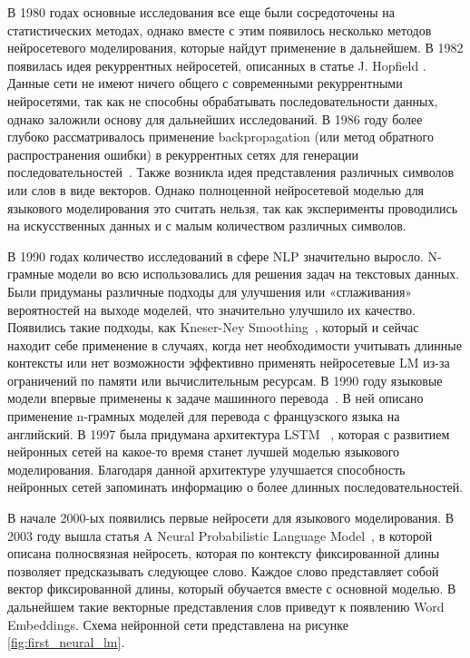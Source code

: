 В 1980 годах основные исследования все еще были сосредоточены на статистических методах, однако вместе с этим появилось несколько методов нейросетевого моделирования, которые найдут применение в дальнейшем. В 1982 появилась идея рекуррентных нейросетей, описанных в статье J. Hopfield \cite{hopfield_rnn}. Данные сети не имеют ничего общего с современными рекуррентными нейросетями, так как не способны обрабатывать последовательности данных, однако заложили основу для дальнейших исследований. В 1986 году более глубоко рассматривалось применение backpropagation (или метод обратного распространения ошибки) в рекуррентных сетях для генерации последовательностей~\cite{rumelhart_backprop}. Также возникла идея представления различных символов или слов в виде векторов. Однако полноценной нейросетевой моделью для языкового моделирования это считать нельзя, так как эксперименты проводились на искусственных данных и с малым количеством различных символов.

В 1990 годах количество исследований в сфере NLP значительно выросло. N-грамные модели во всю использовались для решения задач на текстовых данных. Были придуманы различные подходы для улучшения или «сглаживания» вероятностей на выходе моделей, что значительно улучшило их качество. Появились такие подходы, как Kneser-Ney Smoothing~\cite{kneser_ney}, который и сейчас находит себе применение в случаях, когда нет необходимости учитывать длинные контексты или нет возможности эффективно применять нейросетевые LM из-за ограничений по памяти или вычислительным ресурсам. В 1990 году языковые модели впервые применены к задаче машинного перевода~\cite{mt_first}. В ней описано применение n-грамных моделей для перевода с французского языка на английский. В 1997 была придумана архитектура LSTM ~\cite{lstm}, которая с развитием нейронных сетей на какое-то время станет лучшей моделью языкового моделирования. Благодаря данной архитектуре улучшается способность нейронных сетей запоминать информацию о более длинных последовательностей.

В начале 2000-ых появились первые нейросети для языкового моделирования. В 2003 году вышла статья A Neural Probabilistic Language Model~\cite{first_neural_lm}, в которой описана полносвязная нейросеть, которая по контексту фиксированной длины позволяет предсказывать следующее слово. Каждое слово представляет собой вектор фиксированной длины, который обучается вместе с основной моделью. В дальнейшем такие векторные представления слов приведут к появлению Word Embeddings. Схема нейронной сети представлена на рисунке \ref{fig:first_neural_lm}.


